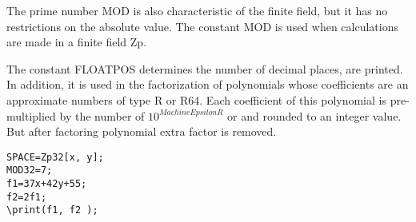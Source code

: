 The prime number MOD is also characteristic of the finite field, but it has no restrictions on the absolute value. The constant MOD is used when calculations are made in a finite field Zp.

The constant FLOATPOS determines the number of decimal places,
are printed. In addition, it is used in the factorization of polynomials whose coefficients are 
an approximate numbers of type R or R64. 
Each coefficient of this polynomial is pre-multiplied by the number of $10^{MachineEpsilonR}$ or 
and rounded to an integer value.
But after factoring polynomial extra factor is removed.



\begin{verbatim}
SPACE=Zp32[x, y]; 
MOD32=7; 
f1=37x+42y+55; 
f2=2f1;  
\print(f1, f2 );
\end{verbatim}

